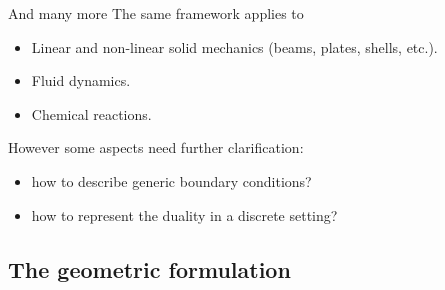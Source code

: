 \documentclass[aspectratio=169]{beamer}
\begin{document}
\begin{frame}{And many more}
	The same framework applies to
	\begin{itemize}
		\item Linear and non-linear solid mechanics (beams, plates, shells, etc.).\\
		\item Fluid dynamics. \\
		\item Chemical reactions.
	\end{itemize}

\begin{tcolorbox}
However some aspects need further clarification:
\begin{itemize}
	\item how to describe generic boundary conditions?
	\item how to represent the duality in a discrete setting?
\end{itemize}
\end{tcolorbox}
\end{frame}





\subsection{The geometric formulation}
\end{document}
